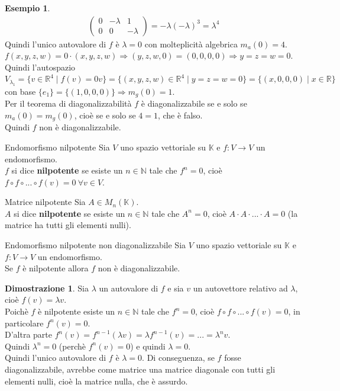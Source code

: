 \documentclass[a4paper]{article}
\theoremstyle{definition}
\newtheorem*{dimm}{Dimostrazione}
\newtheorem*{es}{Esempio}
\begin{document}
\begin{es}
\begin{align*}
\begin{pmatrix}
				0 & - \lambda & 1 \\
				0 & 0 & - \lambda
			\end{pmatrix} = - \lambda (- \lambda)^3 = \lambda^4
		\end{align*}
		Quindi l'unico autovalore di $f$ è $\lambda = 0$ con molteplicità algebrica $m_a(0) = 4$. \\
		$f(x, y, z, w) = 0 \cdot (x, y, z, w) \Rightarrow (y, z, w, 0) = (0, 0, 0, 0) \Rightarrow y = z = w = 0$.
		Quindi l'autospazio $V_{\lambda_1} = \{v \in \mathbb{R}^4 \mid f(v) = 0v\} = \{(x, y, z, w) \in \mathbb{R}^4 \mid y = z = w = 0\} = \{(x, 0, 0, 0) \mid x \in \mathbb{R}\}$
		con base $\{e_1\} = \{(1, 0, 0, 0)\} \Rightarrow m_g(0) = 1$. \\
		Per il teorema di diagonalizzabilità $f$ è diagonalizzabile se e solo se $m_a(0) = m_g(0)$, cioè se e solo se $4 = 1$, che è falso. \\
		Quindi $f$ non è diagonalizzabile.
	\end{es}

	\begin{deff}{Endomorfismo nilpotente}{}
		Sia $V$ uno spazio vettoriale su $\mathbb{K}$ e $f: V \to V$ un endomorfismo. \\
		$f$ si dice \textbf{nilpotente} se esiste un $n \in \mathbb{N}$ tale che $f^n = 0$, cioè $f \circ f \circ ... \circ f(v) = 0 \ \forall v \in V$.
	\end{deff}
	\begin{deff}{Matrice nilpotente}{}
		Sia $A \in M_n(\mathbb{K})$. \\
		$A$ si dice \textbf{nilpotente} se esiste un $n \in \mathbb{N}$ tale che $A^n = 0$, cioè $A \cdot A \cdot ... \cdot A = 0$
		(la matrice ha tutti gli elementi nulli).
	\end{deff}

	\begin{teo}{Endomorfismo nilpotente non diagonalizzabile}{}
		Sia $V$ uno spazio vettoriale su $\mathbb{K}$ e $f: V \to V$ un endomorfismo. \\
		Se $f$ è nilpotente allora $f$ non è diagonalizzabile.
	\end{teo}
	\begin{dimm}
		Sia $\lambda$ un autovalore di $f$ e sia $v$ un autovettore relativo ad $\lambda$, cioè $f(v) = \lambda v$. \\
		Poichè $f$ è nilpotente esiste un $n \in \mathbb{N}$ tale che $f^n = 0$, cioè $f \circ f \circ ... \circ f(v) = 0$, in
		particolare $f^n(v) = 0$. \\
		D'altra parte $f^n(v) = f^{n-1}(\lambda v) = \lambda f^{n-1}(v) = ... = \lambda^n v$. \\
		Quindi $\lambda^n = 0$ (perchè $f^n(v) = 0$) e quindi $\lambda = 0$. \\
		Quindi l'unico autovalore di $f$ è $\lambda = 0$. Di conseguenza, se $f$ fosse diagonalizzabile,
		avrebbe come matrice una matrice diagonale con tutti gli elementi nulli, cioè la matrice nulla, che è assurdo.
	\end{dimm}
\end{document}
